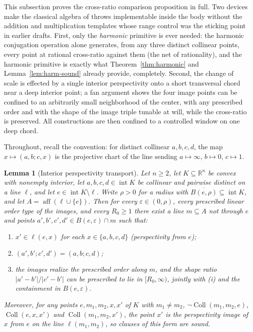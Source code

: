 \documentclass[11pt]{amsart}
\newtheorem{lemma}[theorem]{Lemma}
\theoremstyle{definition}
\newcommand{\R}{\mathbb{R}}
\newcommand{\Coll}{\operatorname{Coll}}
\newcommand{\aff}{\operatorname{aff}}
\newcommand{\interior}{\operatorname{int}}
\begin{document}
This subsection proves the cross-ratio comparison proposition in full. Two
devices make the classical algebra of throws implementable inside the body
without the addition and multiplication templates whose range control was the
sticking point in earlier drafts. First, only the \emph{harmonic} primitive is
ever needed: the harmonic conjugation operation alone generates, from any
three distinct collinear points, every point at rational cross-ratio against
them (the net of rationality), and the harmonic primitive is exactly what
Theorem~\ref{thm:harmonic} and Lemma~\ref{lem:harm-sound} already provide,
completely. Second, the change of scale is effected by a single interior
perspectivity onto a short transversal chord near a deep interior point; a fan
argument shows the four image points can be confined to an arbitrarily small
neighborhood of the center, with any prescribed order and with the shape of
the image triple tunable at will, while the cross-ratio is preserved. All
constructions are then confined to a controlled window on one deep chord.

Throughout, recall the convention: for distinct collinear $a,b,c,d$, the map
$x\mapsto(a,b;c,x)$ is the projective chart of the line sending
$a\mapsto\infty$, $b\mapsto0$, $c\mapsto1$.

\begin{lemma}[Interior perspectivity transport]
\label{lem:transport}
Let $n\ge2$, let $K\subseteq\R^n$ be convex with nonempty interior, let
$a,b,c,d\in\interior K$ be collinear and pairwise distinct on a line $\ell$,
and let $e\in\interior K\setminus\ell$. Write $\rho>0$ for a radius with
$\overline{B(e,\rho)}\subseteq\interior K$, and let $A=\aff(\ell\cup\{e\})$.
Then for every $\varepsilon\in(0,\rho)$, every prescribed linear order type
of the images, and every $R_0\ge1$ there exist a line $m\subseteq A$ not
through $e$ and points $a',b',c',d'\in B(e,\varepsilon)\cap m$ such that:
\begin{enumerate}[label=\textup{(\roman*)}]
\item $x'\in\ell(e,x)$ for each $x\in\{a,b,c,d\}$ \textup(perspectivity from
$e$\textup);
\item $(a',b';c',d')=(a,b;c,d)$;
\item the images realize the prescribed order along $m$, and the shape ratio
$|a'-b'|/|c'-b'|$ can be prescribed to lie in $[R_0,\infty)$, jointly with
\textup{(i)} and the containment in $B(e,\varepsilon)$.
\end{enumerate}
Moreover, for any points $e,m_1,m_2,x,x'$ of $K$ with $m_1\ne m_2$,
$\neg\Coll(m_1,m_2,e)$, $\Coll(e,x,x')$ and $\Coll(m_1,m_2,x')$, the point
$x'$ is the perspectivity image of $x$ from $e$ on the line $\ell(m_1,m_2)$,
so clauses of this form are sound.
\end{lemma}
\end{document}
